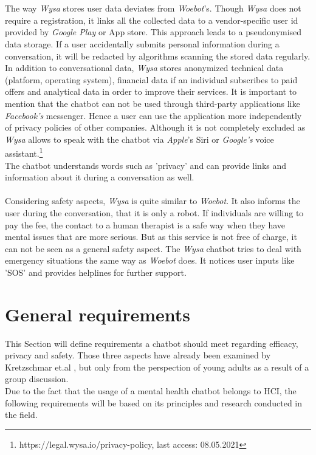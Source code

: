 \documentclass[sigconf, nonacm]{acmart}
\begin{document}
\\\\
The way \emph{Wysa} stores user data deviates from \emph{Woebot}'s. Though \emph{Wysa} does not require a registration, it links all the collected data to a vendor-specific user id provided by \emph{Google Play} or App store. This approach leads to a pseudonymised data storage.
If a user accidentally submits personal information during a conversation, it will be redacted by algorithms scanning the stored data regularly. In addition to conversational data, \emph{Wysa} stores anonymized technical data (platform, operating system), 
financial data if an individual subscribes to paid offers and analytical data in order to improve their services. 
It is important to mention that the chatbot can not be used through third-party applications like \emph{Facebook's} messenger. Hence a user can use the application more independently of privacy policies of other companies. Although it is not completely excluded as \emph{Wysa} allows to speak with the chatbot 
via \emph{Apple}'s Siri or \emph{Google's} voice assistant.\footnote{https://legal.wysa.io/privacy-policy, last access: 08.05.2021}
\\
The chatbot understands words such as 'privacy' and can provide links and information about it during a conversation as well.\cite{Kretzschmar2019}
\\\\
Considering safety aspects, \emph{Wysa} is quite similar to \emph{Woebot}. It also informs the user during the conversation, that it is only a robot. If individuals are willing to pay the fee, the contact to a human therapist is a safe way when they have mental issues that are 
more serious. But as this service is not free of charge, it can not be seen as a general safety aspect. The \emph{Wysa} chatbot tries to deal with emergency situations the same way as \emph{Woebot} does. It notices user inputs like 'SOS' and provides helplines for further support.\cite{Kretzschmar2019}
\section{General requirements}
\label{sec:three}
This Section will define requirements a chatbot should meet regarding efficacy, privacy and safety. Those three aspects have already been examined by Kretzschmar et.al \cite{Kretzschmar2019}, but only from the perspection of young adults as a result of a group discussion.
\\
Due to the fact that the usage of a mental health chatbot belongs to HCI, the following requirements will be based on its principles and research conducted in the field.
\end{document}
